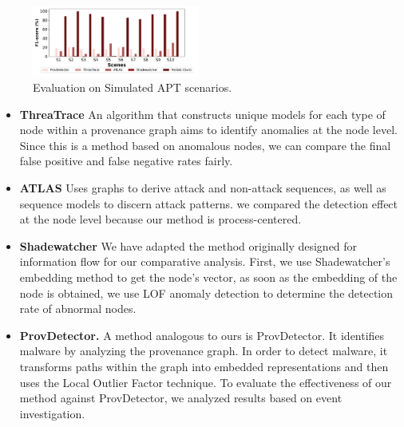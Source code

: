 \begin{figure}[ht]
    \centering
      \includegraphics[width=0.49\textwidth]{figs/compare.pdf}
    \caption{Evaluation on Simulated APT scenarios.}
    \label{fig-eva-apt}
\end{figure}

\begin{itemize}
    \item \textbf{ThreaTrace}\cite{wang2022threatrace} An algorithm that constructs unique models for each type of node within a provenance graph aims to identify anomalies at the node level. Since this is a method based on anomalous nodes, we can compare the final false positive and false negative rates fairly.
    \item \textbf{ATLAS}\cite{alsaheel2021atlas} Uses graphs to derive attack and non-attack sequences, as well as sequence models to discern attack patterns. we compared the detection effect at the node level because our method is process-centered.
    \item \textbf{Shadewatcher} \cite{zengy2022shadewatcher} We have adapted the method originally designed for information flow for our comparative analysis. First, we use Shadewatcher's embedding method to get the node's vector, as soon as the embedding of the node is obtained, we use LOF anomaly detection to determine the detection rate of abnormal nodes.
    \item \textbf{ProvDetector.} A method analogous to ours is ProvDetector\cite{wang2020you}. It identifies malware by analyzing the provenance graph. In order to detect malware, it transforms paths within the graph into embedded representations and then uses the Local Outlier Factor technique. To evaluate the effectiveness of our method against ProvDetector, we analyzed results based on event investigation.
\end{itemize}


